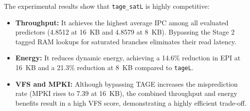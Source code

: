 \documentclass[11pt,a4paper,twocolumn]{article}
\begin{document}
The experimental results show that \texttt{tage\_satL} is highly competitive:
\begin{itemize}
    \item \textbf{Throughput:} It achieves the highest average IPC among all evaluated predictors (4.8512 at 16~KB and 4.8579 at 8~KB). Bypassing the Stage 2 tagged RAM lookups for saturated branches eliminates their read latency.
    \item \textbf{Energy:} It reduces dynamic energy, achieving a 14.6\% reduction in EPI at 16~KB and a 21.3\% reduction at 8~KB compared to \texttt{tageL}.
    \item \textbf{VFS and MPKI:} Although bypassing TAGE increases the misprediction rate (MPKI rises to 7.39 at 16~KB), the combined throughput and energy benefits result in a high VFS score, demonstrating a highly efficient trade-off.
\end{itemize}
\end{document}
